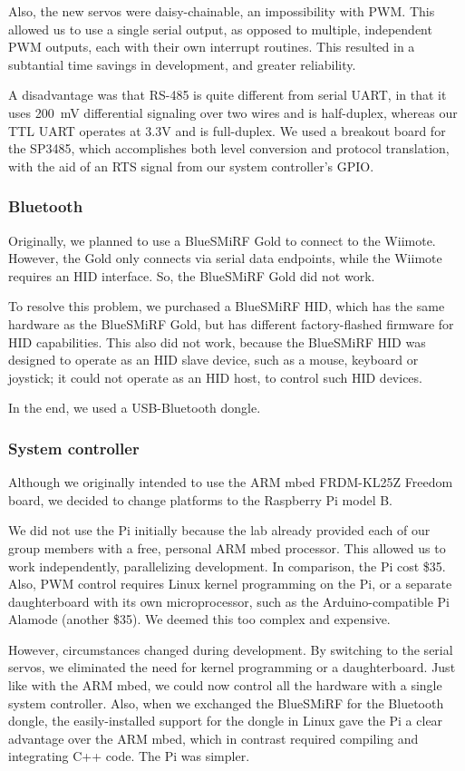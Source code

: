 \documentclass[conference, twocolumn]{IEEEtran}
\begin{document}
Also, the new servos were daisy-chainable, an impossibility with PWM. This allowed us to use a single serial output, as opposed to multiple, independent PWM outputs, each with their own interrupt routines. This resulted in a subtantial time savings in development, and greater reliability.

A disadvantage was that \mbox{RS-485} is quite different from serial UART, in that it uses \mbox{200 mV} differential signaling over two wires and is half-duplex, whereas our TTL UART operates at 3.3V and is full-duplex. We used a breakout board for the SP3485, which accomplishes both level conversion and protocol translation, with the aid of an RTS signal from our system controller's GPIO.

\subsubsection{Bluetooth}
Originally, we planned to use a BlueSMiRF Gold to connect to the Wiimote. However, the Gold only connects via serial data endpoints, while the Wiimote requires an HID interface. So, the BlueSMiRF Gold did not work.

To resolve this problem, we purchased a BlueSMiRF HID, which has the same hardware as the BlueSMiRF Gold, but has different factory-flashed firmware for HID capabilities. This also did not work, because the BlueSMiRF HID was designed to operate as an HID slave device, such as a mouse, keyboard or joystick; it could not operate as an HID host, to control such HID devices.

In the end, we used a USB-Bluetooth dongle.

\subsubsection{System controller}
Although we originally intended to use the ARM mbed \mbox{FRDM-KL25Z} Freedom board, we decided to change platforms to the Raspberry Pi model B.

We did not use the Pi initially because the lab already provided each of our group members with a free, personal ARM mbed processor. This allowed us to work independently, parallelizing development. In comparison, the Pi cost \$35. Also, PWM control requires Linux kernel programming on the Pi, or a separate daughterboard with its own microprocessor, such as the Arduino-compatible Pi Alamode (another \$35). We deemed this too complex and expensive.

However, circumstances changed during development. By switching to the serial servos, we eliminated the need for kernel programming or a daughterboard. Just like with the ARM mbed, we could now control all the hardware with a single system controller. Also, when we exchanged the BlueSMiRF for the Bluetooth dongle, the easily-installed support for the dongle in Linux gave the Pi a clear advantage over the ARM mbed, which in contrast required compiling and integrating C++ code. The Pi was simpler.
\end{document}
